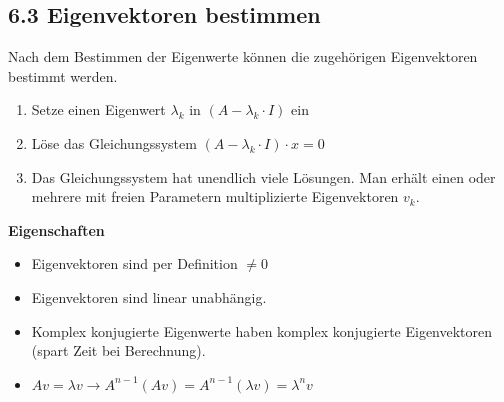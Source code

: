 \subsection{6.3 Eigenvektoren bestimmen}{
\vspace{-1pt}
Nach dem Bestimmen der Eigenwerte können die zugehörigen Eigenvektoren bestimmt werden.
\begin{enumerate}[label=\protect\circled{\arabic*}, itemsep=-1pt]
\item Setze einen Eigenwert $\lambda_k$ in $(A - \lambda_k \cdot I)$ ein
\item Löse das Gleichungssystem $(A - \lambda_k \cdot I)\cdot x = 0$
\item Das Gleichungssystem hat unendlich viele Lösungen. Man erhält einen oder mehrere mit freien Parametern multiplizierte Eigenvektoren $v_k$.
\end{enumerate}

\vskip1pt

\textbf{Eigenschaften}
\vspace{-2pt}
\begin{itemize}[leftmargin=0.29cm, itemsep=0pt]
\item Eigenvektoren sind per Definition $\neq 0$
\item Eigenvektoren sind linear unabhängig.
\item Komplex konjugierte Eigenwerte haben komplex konjugierte Eigenvektoren (spart Zeit bei Berechnung).
\item $Av = \lambda v \rightarrow A^{n-1}(Av) = A^{n-1}(\lambda v) = \lambda^nv$
\end{itemize}
\vspace{-4pt}

}
\WhiteSpace